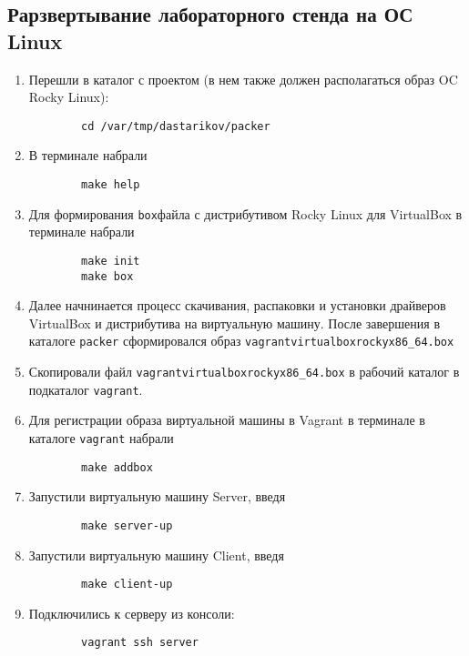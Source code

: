 \subsection{Рарзвертывание лабораторного стенда на ОС Linux}
\begin{enumerate}
    \item Перешли в каталог с проектом (в нем также должен располагаться образ OC Rocky Linux):
        \begin{verbatim}
        cd /var/tmp/dastarikov/packer
        \end{verbatim}
    \item В терминале набрали
        \begin{verbatim}
        makе help
        \end{verbatim}
    \item Для формирования \texttt{box}\-файла с дистрибутивом Rocky Linux для VirtualBox в терминале набрали
        \begin{verbatim}
        make init
        make box
        \end{verbatim}
    \item Далее начнинается процесс скачивания, распаковки и установки драйверов VirtualBox и дистрибутива на виртуальную машину. После завершения в каталоге \texttt{packer} сформировался образ \texttt{vagrant\-virtualbox\-rocky\-x86\_64.box}
    \item Скопировали файл \texttt{vagrant\-virtualbox\-rocky\-x86\_64.box} в рабочий каталог в подкаталог \texttt{vagrant}.
    \item Для регистрации образа виртуальной машины в Vagrant в терминале в каталоге \texttt{vagrant} набрали
        \begin{verbatim}
        make addbox
        \end{verbatim}
    \item Запустили виртуальную машину Server, введя
        \begin{verbatim}
        make server-up
        \end{verbatim}
    \item Запустили виртуальную машину Client, введя
        \begin{verbatim}
        make client-up
        \end{verbatim}
    \item Подключились к серверу из консоли:
        \begin{verbatim}
        vagrant ssh server
        \end{verbatim}

\end{enumerate}
